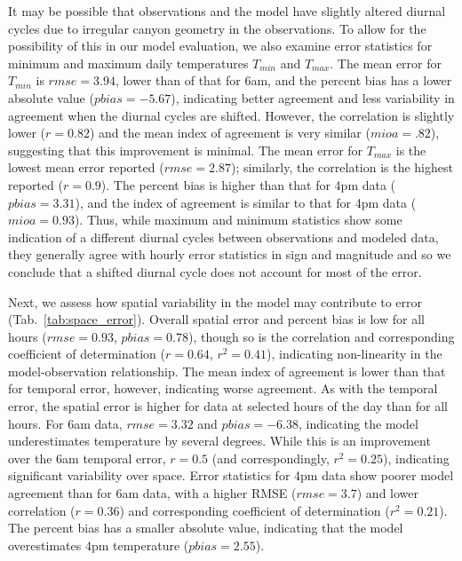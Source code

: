 \documentclass[draft,linenumbers]{agujournal}
\begin{document}
It may be possible that observations and the model have slightly altered diurnal cycles due to irregular canyon geometry in the observations. To allow for the possibility of this in our model evaluation, we also examine error statistics for minimum and maximum daily temperatures $T_{min}$ and $T_{max}$. The mean error for $T_{min}$ is $rmse=3.94$, lower than of that for 6am, and the percent bias has a lower absolute value ($pbias=-5.67$), indicating better agreement and less variability in agreement when the diurnal cycles are shifted. However, the correlation is slightly lower ($r=0.82$) and the mean index of agreement is very similar ($mioa=.82$), suggesting that this improvement is minimal. The mean error for $T_{max}$ is the lowest mean error reported ($rmse=2.87$); similarly, the correlation is the highest reported ($r=0.9$). The percent bias is higher than that for 4pm data ($pbias=3.31$), and the index of agreement is similar to that for 4pm data ($mioa=0.93$).
Thus, while maximum and minimum statistics show some indication of a different diurnal cycles between observations and modeled data, they generally agree with hourly error statistics in sign and magnitude and so we conclude that a shifted diurnal cycle does not account for most of the error.

Next, we 
assess how spatial variability in the model may contribute to error (Tab.~\ref{tab:space_error}). Overall spatial error and percent bias is low for all hours ($rmse=0.93$, $pbias=0.78$), though so is the correlation and corresponding coefficient of determination ($r=0.64$, $r^2=0.41$), indicating non-linearity in the model-observation relationship. 
The mean index of agreement is lower than that for temporal error, however, indicating worse agreement. 
As with the temporal error, the spatial error is higher for data at selected hours of the day than for all hours. For 6am data, $rmse=3.32$ and $pbias=-6.38$, indicating the model underestimates temperature by several degrees. While this is an improvement over the 6am temporal error, $r=0.5$ (and correspondingly, $r^2 = 0.25$), indicating significant variability over space. Error statistics for 4pm data show poorer model agreement than for 6am data, with a higher RMSE ($rmse = 3.7$) and lower correlation ($r=0.36$) and corresponding coefficient of determination ($r^2 = 0.21$). The percent bias has a smaller absolute value, indicating that the model overestimates 4pm temperature ($pbias=2.55$). 
\end{document}
